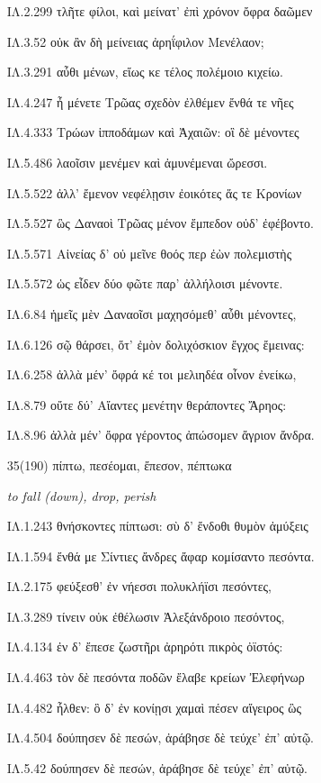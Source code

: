 \begin{enumerate}
{ΙΛ.2.299 τλῆτε φίλοι, καὶ μείνατ' ἐπὶ χρόνον ὄφρα δαῶμεν

ΙΛ.3.52 οὐκ ἂν δὴ μείνειας ἀρηΐφιλον Μενέλαον;

ΙΛ.3.291 αὖθι μένων, εἵως κε τέλος πολέμοιο κιχείω.

ΙΛ.4.247 ἦ μένετε Τρῶας σχεδὸν ἐλθέμεν ἔνθά τε νῆες

ΙΛ.4.333 Τρώων ἱπποδάμων καὶ Ἀχαιῶν: οἳ δὲ μένοντες

ΙΛ.5.486 λαοῖσιν μενέμεν καὶ ἀμυνέμεναι ὤρεσσι.

ΙΛ.5.522 ἀλλ' ἔμενον νεφέλῃσιν ἐοικότες ἅς τε Κρονίων

ΙΛ.5.527 ὣς Δαναοὶ Τρῶας μένον ἔμπεδον οὐδ' ἐφέβοντο.

ΙΛ.5.571 Αἰνείας δ' οὐ μεῖνε θοός περ ἐὼν πολεμιστὴς

ΙΛ.5.572 ὡς εἶδεν δύο φῶτε παρ' ἀλλήλοισι μένοντε.

ΙΛ.6.84 ἡμεῖς μὲν Δαναοῖσι μαχησόμεθ' αὖθι μένοντες,

ΙΛ.6.126 σῷ θάρσει, ὅτ' ἐμὸν δολιχόσκιον ἔγχος ἔμεινας:

ΙΛ.6.258 ἀλλὰ μέν' ὄφρά κέ τοι μελιηδέα οἶνον ἐνείκω,

ΙΛ.8.79 οὔτε δύ' Αἴαντες μενέτην θεράποντες Ἄρηος:

ΙΛ.8.96 ἀλλὰ μέν' ὄφρα γέροντος ἀπώσομεν ἄγριον ἄνδρα.

}


\clearpage
\item[\large 35(190)]{\large \g   πίπτω, πεσέομαι, ἔπεσον, πέπτωκα   }

\hspace{0.2cm} \textit{   to fall (down), drop, perish}

{\g
ΙΛ.1.243 θνήσκοντες πίπτωσι: σὺ δ' ἔνδοθι θυμὸν ἀμύξεις

ΙΛ.1.594 ἔνθά με Σίντιες ἄνδρες ἄφαρ κομίσαντο πεσόντα.

ΙΛ.2.175 φεύξεσθ' ἐν νήεσσι πολυκλήϊσι πεσόντες,

ΙΛ.3.289 τίνειν οὐκ ἐθέλωσιν Ἀλεξάνδροιο πεσόντος,

ΙΛ.4.134 ἐν δ' ἔπεσε ζωστῆρι ἀρηρότι πικρὸς ὀϊστός:

ΙΛ.4.463 τὸν δὲ πεσόντα ποδῶν ἔλαβε κρείων Ἐλεφήνωρ

ΙΛ.4.482 ἦλθεν: ὃ δ' ἐν κονίῃσι χαμαὶ πέσεν αἴγειρος ὣς

ΙΛ.4.504 δούπησεν δὲ πεσών, ἀράβησε δὲ τεύχε' ἐπ' αὐτῷ.

ΙΛ.5.42 δούπησεν δὲ πεσών, ἀράβησε δὲ τεύχε' ἐπ' αὐτῷ.

}
\end{enumerate}
